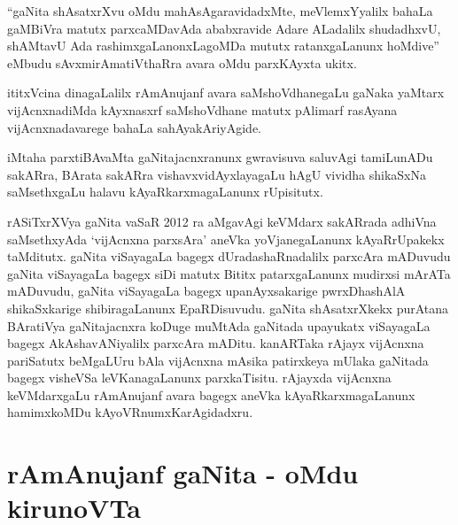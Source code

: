 ``gaNita shAsatxrXvu oMdu mahAsAgaravidadxMte, meVlemxYyalilx bahaLa gaMBiVra matutx parxcaMDavAda ababxravide Adare ALadalilx  shudadhxvU, shAMtavU Ada rashimxgaLanonxLagoMDa mututx ratanxgaLanunx hoMdive'' eMbudu sAvxmirAmatiVthaRra avara oMdu parxKAyxta ukitx.

ititxVcina dinagaLalilx rAmAnujanf avara saMshoVdhanegaLu gaNaka yaMtarx vijAcnxna\-diMda kAyxnasxrf saMshoVdhane matutx pAlimarf rasAyana vijAcnxnadavarege bahaLa sahAya\-kAriyAgide.

iMtaha parxtiBAvaMta gaNitajacnxranunx gwravisuva saluvAgi tamiLunADu sakARra, BArata sakARra vishavxvidAyxlayagaLu hAgU vividha shikaSxNa saMsethxgaLu halavu kAyaRkarxma\-gaLanunx rUpisitutx.

rASiTxrXVya gaNita vaSaR {\rm 2012} ra aMgavAgi keVMdarx sakARrada adhiVna saMsethxyAda `vijAcnxna parxsAra' aneVka yoVjanegaLanunx kAyaRrUpakekx taMditutx. gaNita viSayagaLa bagegx dUradashaRnadalilx parxcAra mADuvudu gaNita viSayagaLa bagegx siDi matutx Bititx patarxgaLanunx mudirxsi mArATa mADuvudu, gaNita viSayagaLa bagegx upanAyxsakarige pwrxDhashAlA shikaSxkarige shibiragaLanunx EpaRDisuvudu. gaNita shAsatxrXkekx purAtana BAratiVya gaNitajacnxra koDuge muMtAda gaNitada upayukatx viSayagaLa bagegx AkAshavANiyalilx parxcAra mADitu. kanARTaka rAjayx vijAcnxna pariSatutx beMgaLUru bAla vijAcnxna mAsika patirxkeya mUlaka gaNitada bagegx visheVSa leVKanagaLanunx parxkaTisitu. rAjayxda vijAcnxna keVMdarxgaLu rAmAnujanf avara bagegx aneVka kAyaRkarxmagaLanunx hamimxkoMDu kAyoVRnumxKarAgidadxru.

\section*{rAmAnujanf gaNita - oMdu kirunoVTa}


